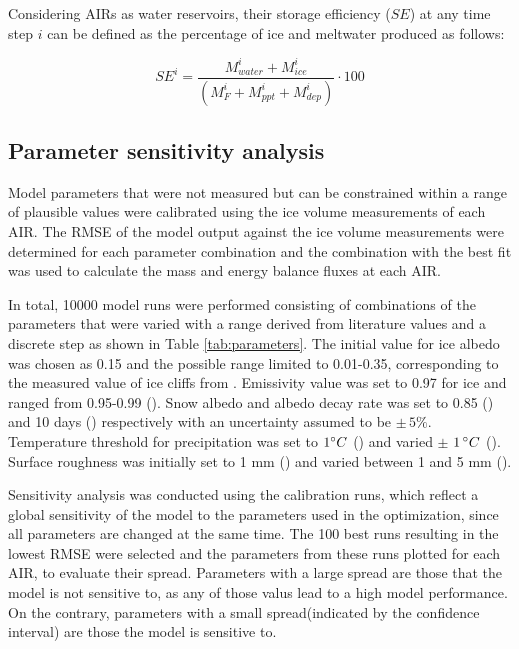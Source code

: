 \documentclass[utf8]{frontiersSCNS} %
\begin{document}
 Considering AIRs as water reservoirs, their storage efficiency ($SE$) at any time step $i$ can be defined as the
 percentage of ice and meltwater produced as follows:

\begin{equation} \textit{SE}^i = \frac{M_{water}^i+M_{ice}^i}{(M_F^i+M_{ppt}^i+M_{dep}^i)} \cdot 100 \end{equation}

\subsection{Parameter sensitivity analysis}
Model parameters that were not measured but can be constrained within a range of plausible values were calibrated using
the ice volume measurements of each AIR. The RMSE of the model output against the ice volume measurements were
determined for each parameter combination and the combination with the best fit was used to calculate the mass and
energy balance fluxes at each AIR. 

In total, 10000 model runs were performed consisting of combinations of the parameters that were varied with a range
derived from literature values and a discrete step as shown in Table \ref{tab:parameters}. The initial value for ice
albedo was chosen as 0.15 and the possible range limited to 0.01-0.35, corresponding to the measured value of ice cliffs
from \cite{steiner_2015}. Emissivity value was set to 0.97 for ice and ranged from 0.95-0.99 (\cite{steiner_2015}). Snow
albedo and albedo decay rate was set to 0.85 (\cite{CuffeyPaterson_2010}) and 10 days (\cite{Schmidt_2017}) respectively
with an uncertainty assumed to be $\pm \,5 \%$. Temperature threshold for precipitation was set to $1 \degree C$
(\cite{FujitaAgeta_2000}) and varied $\pm$ $1\,\degree C$ (\cite{Zhou_2010}).  Surface roughness was initially set to 1
mm (\cite{pellicciotti_2005}) and varied between 1 and 5 mm (\cite{BrockWillisSharp_2006}). 

Sensitivity analysis was conducted using the calibration runs, which reflect a global sensitivity of the model to the
parameters used in the optimization, since all parameters are changed at the same time.  The 100 best runs resulting in
the lowest RMSE were selected and the parameters from these runs plotted for each AIR, to evaluate their spread.
Parameters with a large spread are those that the model is not sensitive to, as any of those valus lead to a high model
performance. On the contrary, parameters with a small spread(indicated by the confidence interval) are those the model
is sensitive to. 
\end{document}
